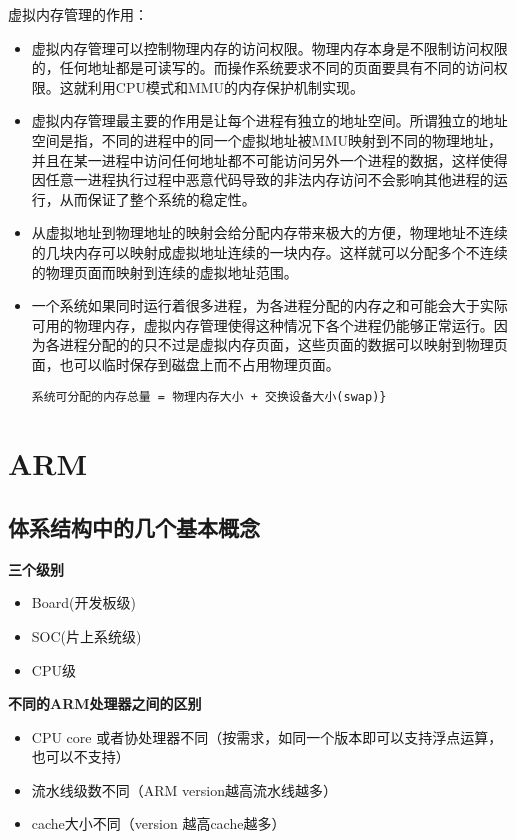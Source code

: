 虚拟内存管理的作用：
\begin{itemize}
	\item  虚拟内存管理可以控制物理内存的访问权限。物理内存本身是不限制访问权限的，任何地址都是可读写的。而操作系统要求不同的页面要具有不同的访问权限。这就利用CPU模式和MMU的内存保护机制实现。
	\item  虚拟内存管理最主要的作用是让每个进程有独立的地址空间。所谓独立的地址空间是指，不同的进程中的同一个虚拟地址被MMU映射到不同的物理地址，并且在某一进程中访问任何地址都不可能访问另外一个进程的数据，这样使得因任意一进程执行过程中恶意代码导致的非法内存访问不会影响其他进程的运行，从而保证了整个系统的稳定性。
	\item  从虚拟地址到物理地址的映射会给分配内存带来极大的方便，物理地址不连续的几块内存可以映射成虚拟地址连续的一块内存。这样就可以分配多个不连续的物理页面而映射到连续的虚拟地址范围。
	\item  一个系统如果同时运行着很多进程，为各进程分配的内存之和可能会大于实际可用的物理内存，虚拟内存管理使得这种情况下各个进程仍能够正常运行。因为各进程分配的的只不过是虚拟内存页面，这些页面的数据可以映射到物理页面，也可以临时保存到磁盘上而不占用物理页面。
\begin{verbatim}
系统可分配的内存总量 = 物理内存大小 + 交换设备大小(swap)}
\end{verbatim}
\end{itemize}

\section{ARM}
\subsection{体系结构中的几个基本概念}
\textbf{三个级别}
\begin{itemize}
	\item Board(开发板级)
	\item SOC(片上系统级)
	\item CPU级
\end{itemize}

\textbf{不同的ARM处理器之间的区别}
\begin{itemize}
	\item CPU core 或者协处理器不同（按需求，如同一个版本即可以支持浮点运算，也可以不支持）
	\item 流水线级数不同（ARM version越高流水线越多）
	\item cache大小不同（version 越高cache越多）
\end{itemize}

